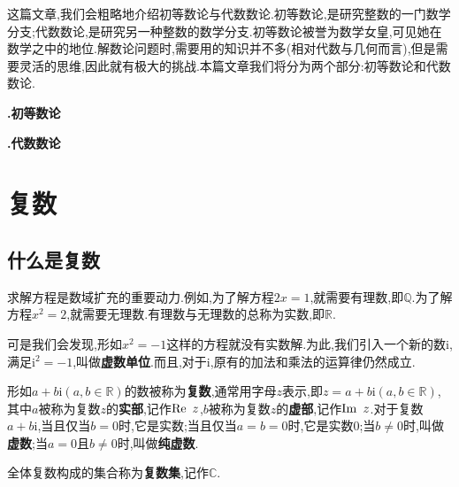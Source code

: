 \documentclass{article}
\title{}
\author{李衡岳 \and 程昊一 \and 王一丁}
\begin{document}
\maketitle
这篇文章,我们会粗略地介绍初等数论与代数数论.初等数论,是研究整数的一门数学分支;代数数论,是研究另一种整数的数学分支.初等数论被誉为数学女皇,可见她在数学之中的地位.解数论问题时,需要用的知识并不多(相对代数与几何而言),但是需要灵活的思维,因此就有极大的挑战.本篇文章我们将分为两个部分:初等数论和代数数论.

\newpage
\vspace*{\fill}
\begin{center}
	{\fontsize{42pt}{\baselineskip}\selectfont\textbf{\uppercase\expandafter{}.{初等数论}}}
\end{center}
\vspace*{\fill}
\newpage

\newpage
\vspace*{\fill}
\begin{center}
	{\fontsize{42pt}{\baselineskip}\selectfont\textbf{\uppercase\expandafter{}.{代数数论}}}
\end{center}
\vspace*{\fill}
\newpage
\section{复数}
\subsection{什么是复数}
求解方程是数域扩充的重要动力.例如,为了解方程$2x=1$,就需要有理数,即$\mathbb{Q}$.为了解方程$x^2=2$,就需要无理数.有理数与无理数的总称为实数,即$\mathbb{R}$.
\par 可是我们会发现,形如$x^2=-1$这样的方程就没有实数解.为此,我们引入一个新的数$\mathrm{i}$,满足$\mathrm{i}^2=-1$,叫做\textbf{虚数单位}.而且,对于$\mathrm{i}$,原有的加法和乘法的运算律仍然成立.
\par 形如$a+b\mathrm{i}(a,b\in\mathbb{R} )$的数被称为\textbf{复数},通常用字母$z$表示,即$z=a+b\mathrm{i}(a,b\in\mathbb{R})$,其中$a$被称为复数$z$的\textbf{实部},记作$\mathrm{Re}\hspace*{0.5em}z$,$b$被称为复数$z$的\textbf{虚部},记作$\mathrm{Im}\hspace*{0.5em}z$.对于复数$a+b\mathrm{i}$,当且仅当$b=0$时,它是实数;当且仅当$a=b=0$时,它是实数0;当$b\neq 0$时,叫做\textbf{虚数};当$a=0$且$b\neq 0$时,叫做\textbf{纯虚数}.
\par 全体复数构成的集合称为\textbf{复数集},记作$\mathbb{C}$.



\newpage
\begin{thebibliography}{99}
\end{thebibliography}
\end{document}
